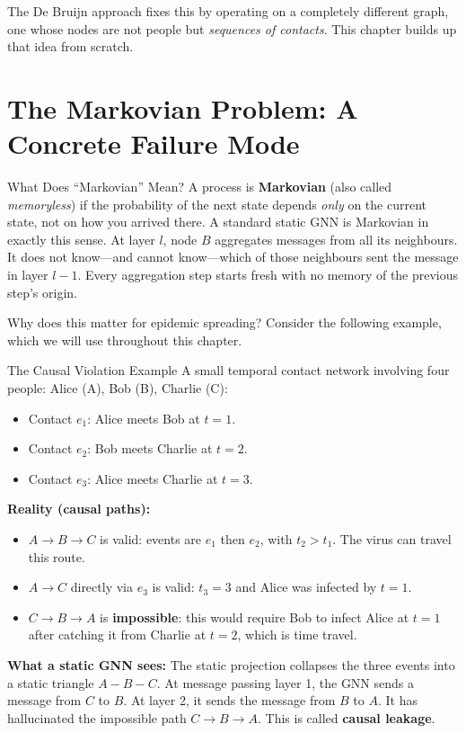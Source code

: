 The De Bruijn approach fixes this by operating on a completely different graph, one whose nodes
are not people but \emph{sequences of contacts}. This chapter builds up that idea from scratch.

\section{The Markovian Problem: A Concrete Failure Mode}

\begin{conceptbox}{What Does ``Markovian'' Mean?}
A process is \textbf{Markovian} (also called \emph{memoryless}) if the probability of the next
state depends \emph{only} on the current state, not on how you arrived there. A standard static
GNN is Markovian in exactly this sense. At layer $l$, node $B$ aggregates messages from all its
neighbours. It does not know---and cannot know---which of those neighbours sent the message in
layer $l-1$. Every aggregation step starts fresh with no memory of the previous step's origin.
\end{conceptbox}

Why does this matter for epidemic spreading? Consider the following example, which we will use
throughout this chapter.

\begin{examplebox}{The Causal Violation Example}
A small temporal contact network involving four people: Alice (A), Bob (B), Charlie (C):
\begin{itemize}[noitemsep]
    \item Contact $e_1$: Alice meets Bob at $t = 1$.
    \item Contact $e_2$: Bob meets Charlie at $t = 2$.
    \item Contact $e_3$: Alice meets Charlie at $t = 3$.
\end{itemize}

\textbf{Reality (causal paths):}
\begin{itemize}[noitemsep]
    \item $A \to B \to C$ is valid: events are $e_1$ then $e_2$, with $t_2 > t_1$. The virus
          can travel this route.
    \item $A \to C$ directly via $e_3$ is valid: $t_3 = 3$ and Alice was infected by $t=1$.
    \item $C \to B \to A$ is \textbf{impossible}: this would require Bob to infect Alice at
          $t=1$ after catching it from Charlie at $t=2$, which is time travel.
\end{itemize}

\textbf{What a static GNN sees:}
The static projection collapses the three events into a static triangle $A-B-C$. At message
passing layer 1, the GNN sends a message from $C$ to $B$. At layer 2, it sends the message from
$B$ to $A$. It has hallucinated the impossible path $C \to B \to A$. This is called
\textbf{causal leakage}.
\end{examplebox}

